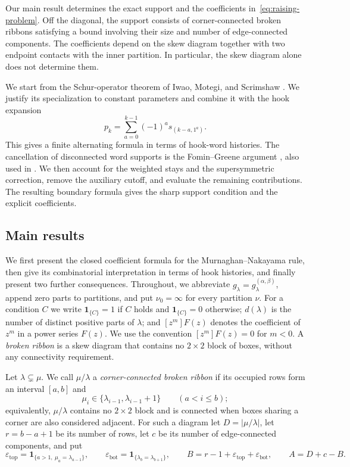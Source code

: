 \documentclass[11pt]{amsart}
\numberwithin{equation}{section}
\theoremstyle{definition}
\theoremstyle{remark}
\newcommand{\ind}{\mathbf 1}
\begin{document}
Our main result determines the exact support and the coefficients
in~\eqref{eq:raising-problem}. Off the diagonal, the support consists
of corner-connected broken ribbons satisfying a bound involving
their size and number of edge-connected components. The coefficients
depend on the skew diagram together with two endpoint contacts with
the inner partition. In particular, the skew diagram alone does not
determine them.

We start from the Schur-operator theorem of Iwao, Motegi, and
Scrimshaw \cite[Thm.~3.2]{IMS25}.
We justify its specialization to constant parameters and combine
it with the hook expansion 
\begin{equation}\label{eq:hook-expansion}
 p_k=\sum_{a=0}^{k-1}(-1)^a s_{(k-a,1^a)}.
\end{equation}
This gives a finite alternating formula in terms of hook-word
histories. The cancellation of disconnected word supports is the
Fomin--Greene argument \cite[Thm.~1.3]{FominGreene}, also used in
\cite{BSZ,NguyenKk}. We then account for the weighted stays and the
supersymmetric correction, remove the auxiliary cutoff, and evaluate
the remaining contributions. The resulting boundary formula gives
the sharp support condition and the explicit coefficients.

\subsection{Main results}
We first present the closed coefficient formula for the
Murnaghan--Nakayama rule, then give its combinatorial
interpretation in terms of hook histories, and finally
present two further consequences. Throughout, we abbreviate $g_\lambda=g^{(\alpha,\beta)}_\lambda$,
append zero parts to partitions, and put $\nu_0=\infty$ for
every partition $\nu$. For a condition $C$ we write $\ind_{\{C\}}=1$ if
$C$ holds and $\ind_{\{C\}}=0$ otherwise; $d(\lambda)$ is the number of
distinct positive parts of $\lambda$; and $[z^m]F(z)$ denotes the coefficient
of $z^m$ in a power series $F(z)$. We use the convention $[z^m]F(z)=0$ for $m<0$. A \emph{broken ribbon} is a skew diagram
that contains no $2\times2$ block of boxes, without any connectivity
requirement.

Let $\lambda\subsetneq\mu$. We call $\mu/\lambda$ a \emph{corner-connected
broken ribbon} if its occupied rows form an interval $[a,b]$ and
\begin{equation}\label{eq:cc-intro}
 \mu_i\in\{\lambda_{i-1},\lambda_{i-1}+1\}\qquad(a<i\leq b);
\end{equation}
equivalently, $\mu/\lambda$ contains no $2\times2$ block and is connected
when boxes sharing a corner are also considered adjacent. For such a
diagram let $D=|\mu/\lambda|$, let $r=b-a+1$ be its number of rows, let $c$
be its number of edge-connected components, and put
\[
 \varepsilon_{\mathrm{top}}=\ind_{\{a>1,\ \mu_a=\lambda_{a-1}\}},\qquad
 \varepsilon_{\mathrm{bot}}=\ind_{\{\lambda_b=\lambda_{b+1}\}},\qquad
 B=r-1+\varepsilon_{\mathrm{top}}+\varepsilon_{\mathrm{bot}},\qquad
 A=D+c-B .
\]
\end{document}
